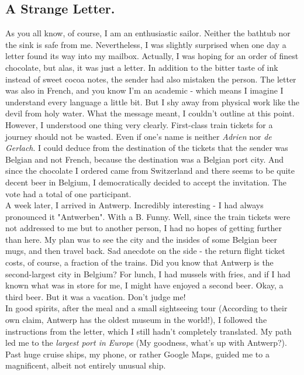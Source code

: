 \documentclass{article}
\begin{document}
  \subsection{A Strange Letter.}
  \noindent 
  As you all know, of course, I am an enthusiastic sailor. Neither the bathtub
  nor the sink is safe from me. Nevertheless, I was slightly surprised when one day a letter found its way into my
  mailbox. Actually, I was hoping for an order of finest chocolate, but alas, it was just a letter. In addition to
  the bitter taste of ink instead of sweet cocoa notes, the sender had also mistaken the person. The letter was
  also in French, and you know I'm an academic - which means I imagine I understand every language a little bit.
  But I shy away from physical work like the devil from holy water. What the message meant, I couldn't outline at
  this point. However, I understood one thing very clearly. First-class train tickets for a journey should not be
  wasted. Even if one's name is neither \textit{Adrien} nor \textit{de Gerlach}. I could deduce from the destination
  of the tickets that the sender was Belgian and not French, because the destination was a Belgian port city. And
  since the chocolate I ordered came from Switzerland and there seems to be quite decent beer in Belgium, I
  democratically decided to accept the invitation. The vote had a total of one participant.\\
  \noindent A week later, I arrived in Antwerp. Incredibly interesting - I had always pronounced it "Antwerben". With a B.
  Funny. Well, since the train tickets were not addressed to me but to another person, I had no hopes of getting
  further than here. My plan was to see the city and the insides of some Belgian beer mugs, and then travel back.
  Sad anecdote on the side - the return flight ticket costs, of course, a fraction of the trains. Did you know
  that
  Antwerp is the second-largest city in Belgium? For lunch, I had mussels with fries, and if I had known what was
  in
  store for me, I might have enjoyed a second beer. Okay, a third beer. But it was a vacation. Don't judge me!\\
  \noindent In good spirits, after the meal and a small sightseeing tour (According to their own claim, Antwerp has the
  oldest museum in the world!), I followed the instructions from the letter, which I still hadn't completely
  translated. My path led me to the \textit{largest port in Europe} (My goodness, what's up with Antwerp?). Past
  huge
  cruise ships, my phone, or rather Google Maps, guided me to a magnificent, albeit not entirely unusual ship.
\end{document}
